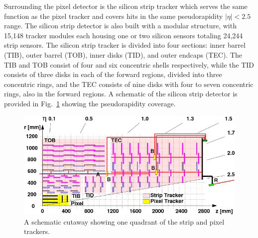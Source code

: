 Surrounding the pixel detector is the silicon strip tracker \cite{SiliconStrip} which serves the same function as the pixel tracker and covers hits in the same pseudorapidity $|\eta|<2.5$ range. The silicon strip detector is also built with a modular structure, with 15,148 tracker modules each housing one or two silicon sensors totaling 24,244 strip sensors. The silicon strip tracker is divided into four sections: inner barrel (TIB), outer barrel (TOB), inner disks (TID), and outer endcaps (TEC). The TIB and TOB consist of four and six concentric shells respectively, while the TID consists of three disks in each of the forward regions, divided into three concentric rings, and the TEC consists of nine disks with four to seven concentric rings, also in the forward regions. A schematic of the silicon strip detector is provided in Fig.~\ref{fig:StripDiagram} showing the pseudorapidity coverage.

\begin{figure}[H]
    \centering
    \includegraphics[width=\textwidth]{Images/CMS/TrackerQuadrant.png}
    \caption{A schematic cutaway showing one quadrant of the strip and pixel trackers.}
    \label{fig:StripDiagram}
\end{figure}